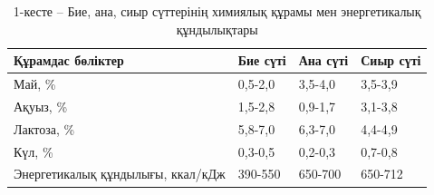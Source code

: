 \begin{table}[H]
\caption*{1-кесте -- Бие, ана, сиыр сүттерінің химиялық құрамы мен энергетикалық құндылықтары}
\centering
\begin{tabular}{|l|l|l|l|}
\hline
Құрамдас бөліктер & Бие сүті & Ана сүті & Сиыр сүті \\ \hline
Май, \% & 0,5-2,0 & 3,5-4,0 & 3,5-3,9 \\ \hline
Ақуыз, \% & 1,5-2,8 & 0,9-1,7 & 3,1-3,8 \\ \hline
Лактоза, \% & 5,8-7,0 & 6,3-7,0 & 4,4-4,9 \\ \hline
Күл, \% & 0,3-0,5 & 0,2-0,3 & 0,7-0,8 \\ \hline
Энергетикалық құндылығы, ккал/кДж & 390-550 & 650-700 & 650-712 \\ \hline
\end{tabular}
\end{table}

